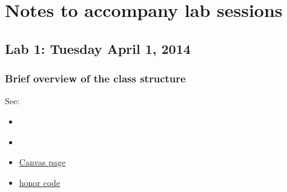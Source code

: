 \documentclass[letterpaper,10pt,english]{sphinxmanual}
\begin{document}
\section{Notes to accompany lab sessions}
\label{labs/index:labs}\label{labs/index:notes-to-accompany-lab-sessions}\label{labs/index::doc}

\subsection{Lab 1: Tuesday April 1, 2014}
\label{labs/lab1:lab1}\label{labs/lab1::doc}\label{labs/lab1:lab-1-tuesday-april-1-2014}

\subsubsection{Brief overview of the class structure}
\label{labs/lab1:brief-overview-of-the-class-structure}
See:
\begin{itemize}
\item {} 
{\hyperref[class_format:class\string-format]{}}

\item {} 
{\hyperref[computing_options:computing\string-options]{}}

\item {} 
\href{https://canvas.uw.edu/courses/893991}{Canvas page}

\item {} 
\href{https://canvas.uw.edu/courses/893991/wiki/honor-code}{honor code}

\end{itemize}
\end{document}
